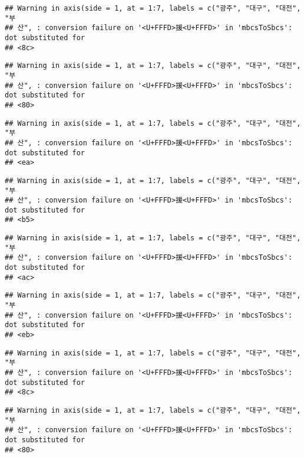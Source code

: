 \documentclass[]{article}
\begin{document}
\begin{verbatim}
## Warning in axis(side = 1, at = 1:7, labels = c("광주", "대구", "대전", "부
## 산", : conversion failure on '<U+FFFD>援<U+FFFD>' in 'mbcsToSbcs': dot substituted for
## <8c>
\end{verbatim}

\begin{verbatim}
## Warning in axis(side = 1, at = 1:7, labels = c("광주", "대구", "대전", "부
## 산", : conversion failure on '<U+FFFD>援<U+FFFD>' in 'mbcsToSbcs': dot substituted for
## <80>
\end{verbatim}

\begin{verbatim}
## Warning in axis(side = 1, at = 1:7, labels = c("광주", "대구", "대전", "부
## 산", : conversion failure on '<U+FFFD>援<U+FFFD>' in 'mbcsToSbcs': dot substituted for
## <ea>
\end{verbatim}

\begin{verbatim}
## Warning in axis(side = 1, at = 1:7, labels = c("광주", "대구", "대전", "부
## 산", : conversion failure on '<U+FFFD>援<U+FFFD>' in 'mbcsToSbcs': dot substituted for
## <b5>
\end{verbatim}

\begin{verbatim}
## Warning in axis(side = 1, at = 1:7, labels = c("광주", "대구", "대전", "부
## 산", : conversion failure on '<U+FFFD>援<U+FFFD>' in 'mbcsToSbcs': dot substituted for
## <ac>
\end{verbatim}

\begin{verbatim}
## Warning in axis(side = 1, at = 1:7, labels = c("광주", "대구", "대전", "부
## 산", : conversion failure on '<U+FFFD>援<U+FFFD>' in 'mbcsToSbcs': dot substituted for
## <eb>
\end{verbatim}

\begin{verbatim}
## Warning in axis(side = 1, at = 1:7, labels = c("광주", "대구", "대전", "부
## 산", : conversion failure on '<U+FFFD>援<U+FFFD>' in 'mbcsToSbcs': dot substituted for
## <8c>
\end{verbatim}

\begin{verbatim}
## Warning in axis(side = 1, at = 1:7, labels = c("광주", "대구", "대전", "부
## 산", : conversion failure on '<U+FFFD>援<U+FFFD>' in 'mbcsToSbcs': dot substituted for
## <80>
\end{verbatim}
\end{document}
